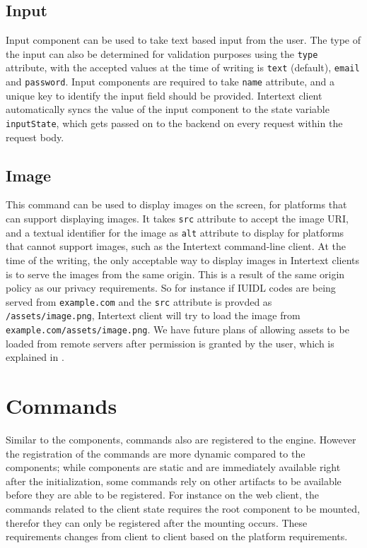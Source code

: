 \subsection{Input}

Input component can be used to take text based input from the user. The type of the input can also be determined for validation purposes using the \texttt{type} attribute, with the accepted values at the time of writing is \texttt{text} (default), \texttt{email} and \texttt{password}. Input components are required to take \texttt{name} attribute, and a unique key to identify the input field should be provided. Intertext client automatically syncs the value of the input component to the state variable \texttt{inputState}, which gets passed on to the backend on every request within the request body.

\subsection{Image}

This command can be used to display images on the screen, for platforms that can support displaying images. It takes \texttt{src} attribute to accept the image URI, and a textual identifier for the image as \texttt{alt} attribute to display for platforms that cannot support images, such as the Intertext command-line client. At the time of the writing, the only acceptable way to display images in Intertext clients is to serve the images from the same origin. This is a result of the same origin policy as our privacy requirements. So for instance if IUIDL codes are being served from \texttt{example.com} and the \texttt{src} attribute is provded as \texttt{/assets/image.png}, Intertext client will try to load the image from \texttt{example.com/assets/image.png}. We have future plans of allowing assets to be loaded from remote servers after permission is granted by the user, which is explained in .

\section{Commands}

Similar to the components, commands also are registered to the engine. However the registration of the commands are more dynamic compared to the components; while components are static and are immediately available right after the initialization, some commands rely on other artifacts to be available before they are able to be registered. For instance on the web client, the commands related to the client state requires the root component to be mounted, therefor they can only be registered after the mounting occurs. These requirements changes from client to client based on the platform requirements.

